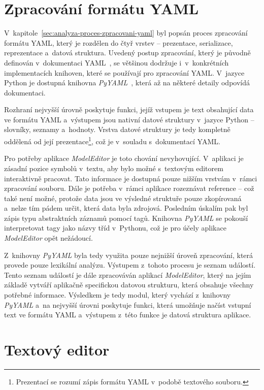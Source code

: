 \documentclass[FM,bw,DP]{tulthesis}
\begin{document}
\section{Zpracování formátu YAML}
\label{sec:implementace-yaml}

V~kapitole~\ref{sec:analyza-proces-zpracovani-yaml} byl popsán proces zpracování formátu \gls{YAML}, který je rozdělen do čtyř vrstev -- prezentace, serializace, reprezentace a~datová struktura. Uvedený postup zpracování, který je původně definován v~dokumentaci \gls{YAML}~\cite{bib:yaml}, se většinou dodržuje i~v~konkrétních implementacích knihoven, které se používají pro zpracování \gls{YAML}. V~jazyce Python je dostupná knihovna \textit{PyYAML}~\cite{bib:pyyaml}, která až na některé detaily odpovídá dokumentaci.

Rozhraní nejvyšší úrovně poskytuje funkci, jejíž vstupem je text obsahující data ve formátu \gls{YAML} a~výstupem jsou nativní datové struktury v~jazyce Python -- slovníky, seznamy a~hodnoty. Vrstva datové struktury je tedy kompletně oddělená od její prezentace\footnote{Prezentací se rozumí zápis formátu \gls{YAML} v~podobě textového souboru.}, což je v~souladu s~dokumentací \gls{YAML}.

Pro potřeby aplikace \textit{ModelEditor} je toto chování nevyhovující. V~aplikaci je zásadní pozice symbolů v~textu, aby bylo možné s~textovým editorem interaktivně pracovat. Tato informace je dostupná pouze nižším vrstvám v~rámci zpracování souboru. Dále je potřeba v~rámci aplikace rozeznávat reference -- což také není možné, protože data jsou ve výsledné struktuře pouze zkopírovaná a~nelze tím pádem určit, která data byla zdrojová. Posledním úskalím pak byl zápis typu abstraktních záznamů pomocí tagů. Knihovna \textit{PyYAML} se pokouší interpretovat tagy jako názvy tříd v~Pythonu, což je pro účely aplikace \textit{ModelEditor} opět nežádoucí.

Z~knihovny \textit{PyYAML} byla tedy využita pouze nejnižší úroveň zpracování, která provede pouze lexikální analýzu. Výstupem z~tohoto procesu je seznam událostí. Tento seznam událostí je dále zpracováván aplikací \textit{ModelEditor}, který na jejím základě vytváří aplikačně specifickou datovou strukturu, která obsahuje všechny potřebné informace. Výsledkem je tedy modul, který vychází z~knihovny \textit{PyYAML} a~na nejvyšší úrovni poskytuje funkci, která umožňuje načíst vstupní text ve formátu \gls{YAML} a~výstupem z~této funkce je datová struktura aplikace.


\section{Textový editor}
\end{document}
